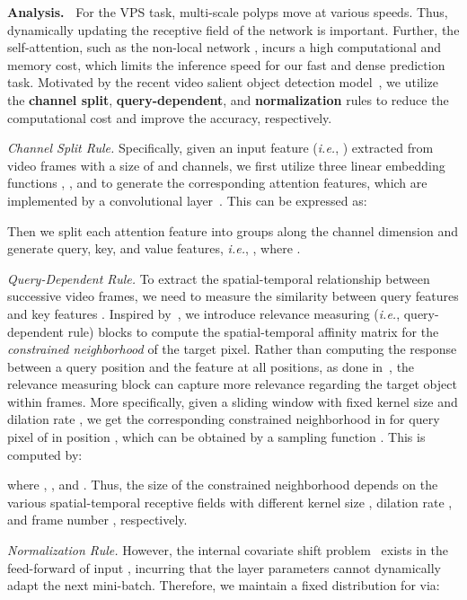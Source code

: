 \documentclass[runningheads]{llncs}
\def\ie{\emph{i.e.}}
\newcommand{\myPara}[1]{\noindent\textbf{#1~}}
\begin{document}
\myPara{Analysis.} For the VPS task, multi-scale polyps move at various speeds. Thus, dynamically updating the receptive field of the network is important. 
Further, the self-attention, such as the non-local network \cite{wang2018non}, incurs a high computational and memory cost, which limits the inference speed for our fast and dense prediction task.
Motivated by the recent video salient object detection model~\cite{gu2020pyramid}, we utilize the \textbf{channel split}, \textbf{query-dependent}, and \textbf{normalization} rules to reduce the computational cost and improve the accuracy, respectively. 

\textit{Channel Split Rule.} Specifically, given an input feature (\ie, ) extracted from  video frames with a size of  and  channels, we first utilize three linear embedding functions , , and  to generate the corresponding attention features, which are implemented by a  convolutional layer~\cite{wang2018non}. 
This can be expressed as:

Then we split each attention feature  into  groups along the channel dimension and generate query, key, and value features, \ie, , where .

\textit{Query-Dependent Rule.}
To extract the spatial-temporal relationship between successive video frames, we need to measure the similarity between query features  and key features .
Inspired by~\cite{gu2020pyramid}, we introduce  relevance measuring (\ie, query-dependent rule) blocks 
to compute the spatial-temporal affinity matrix for the \textit{constrained neighborhood} of the target pixel.
Rather than computing the response between a query position and the feature at all positions, as done in~\cite{wang2018non}, the relevance measuring block can capture more relevance 
regarding the target object within  frames. 
More specifically, given a sliding window with fixed kernel size  and dilation rate , 
we get the corresponding constrained neighborhood in  for query pixel  of  in position , which can be obtained by a sampling function .
This is computed by:

where , , and .
Thus, the size of the constrained neighborhood depends on the various spatial-temporal receptive fields with different kernel size , dilation rate , and frame number , respectively.

\textit{Normalization Rule.}
However, the internal covariate shift problem~\cite{guo2020normalized} exists in the feed-forward of input , incurring that the layer parameters cannot dynamically adapt the next mini-batch.
Therefore, we maintain a fixed distribution for  via: 
\end{document}
